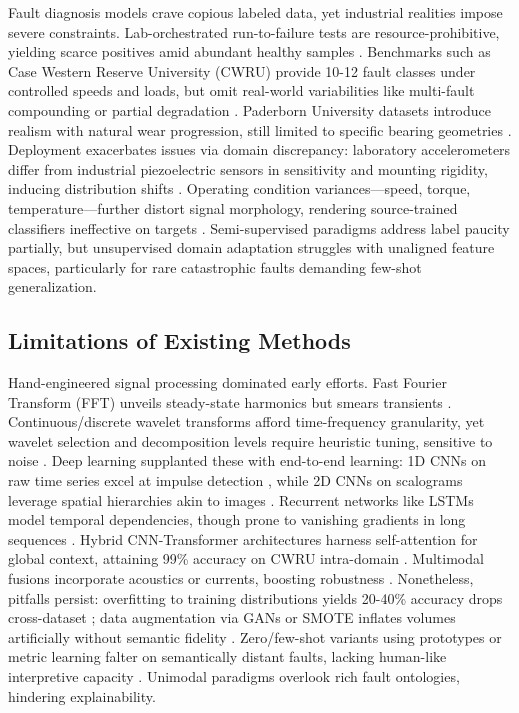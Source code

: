 Fault diagnosis models crave copious labeled data, yet industrial realities impose severe constraints. Lab-orchestrated run-to-failure tests are resource-prohibitive, yielding scarce positives amid abundant healthy samples \cite{cite5}. Benchmarks such as Case Western Reserve University (CWRU) provide 10-12 fault classes under controlled speeds and loads, but omit real-world variabilities like multi-fault compounding or partial degradation \cite{cite6}. Paderborn University datasets introduce realism with natural wear progression, still limited to specific bearing geometries \cite{cite7}. Deployment exacerbates issues via domain discrepancy: laboratory accelerometers differ from industrial piezoelectric sensors in sensitivity and mounting rigidity, inducing distribution shifts \cite{cite8}. Operating condition variances—speed, torque, temperature—further distort signal morphology, rendering source-trained classifiers ineffective on targets \cite{cite9}. Semi-supervised paradigms address label paucity partially, but unsupervised domain adaptation struggles with unaligned feature spaces, particularly for rare catastrophic faults demanding few-shot generalization.

\subsection{Limitations of Existing Methods}

Hand-engineered signal processing dominated early efforts. Fast Fourier Transform (FFT) unveils steady-state harmonics but smears transients \cite{cite10}. Continuous/discrete wavelet transforms afford time-frequency granularity, yet wavelet selection and decomposition levels require heuristic tuning, sensitive to noise \cite{cite11}. Deep learning supplanted these with end-to-end learning: 1D CNNs on raw time series excel at impulse detection \cite{cite12}, while 2D CNNs on scalograms leverage spatial hierarchies akin to images \cite{cite13}. Recurrent networks like LSTMs model temporal dependencies, though prone to vanishing gradients in long sequences \cite{cite14}. Hybrid CNN-Transformer architectures harness self-attention for global context, attaining 99\% accuracy on CWRU intra-domain \cite{cite15}. Multimodal fusions incorporate acoustics or currents, boosting robustness \cite{cite16}. Nonetheless, pitfalls persist: overfitting to training distributions yields 20-40\% accuracy drops cross-dataset \cite{cite17}; data augmentation via GANs or SMOTE inflates volumes artificially without semantic fidelity \cite{cite18}. Zero/few-shot variants using prototypes or metric learning falter on semantically distant faults, lacking human-like interpretive capacity \cite{cite19}. Unimodal paradigms overlook rich fault ontologies, hindering explainability.


